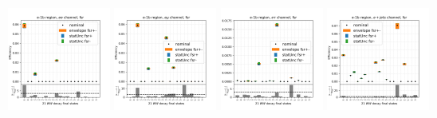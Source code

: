 \begin{figure}
    \includegraphics[width=0.24\textwidth]{chapters/Appendix/sectionTTSyst/figures/afterCorr/icata2_ch0_fsr.png}
    \includegraphics[width=0.24\textwidth]{chapters/Appendix/sectionTTSyst/figures/afterCorr/icata2_ch1_fsr.png}
    \includegraphics[width=0.24\textwidth]{chapters/Appendix/sectionTTSyst/figures/afterCorr/icata2_ch2_fsr.png}
    \includegraphics[width=0.24\textwidth]{chapters/Appendix/sectionTTSyst/figures/afterCorr/icata2_ch3_fsr.png}


\end{figure}
